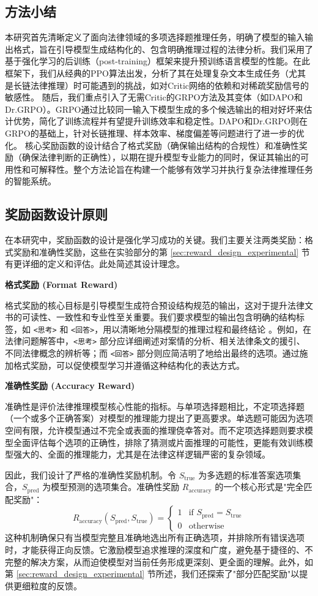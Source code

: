 \documentclass{article}
\begin{document}
\subsection{方法小结}
本研究首先清晰定义了面向法律领域的多项选择题推理任务，明确了模型的输入输出格式，旨在引导模型生成结构化的、包含明确推理过程的法律分析。我们采用了基于强化学习的后训练（post-training）框架来提升预训练语言模型的性能。在此框架下，我们从经典的PPO算法出发，分析了其在处理复杂文本生成任务（尤其是长链法律推理）时可能遇到的挑战，如对Critic网络的依赖和对稀疏奖励信号的敏感性。
随后，我们重点引入了无需Critic的GRPO方法及其变体（如DAPO和Dr.GRPO）。GRPO通过比较同一输入下模型生成的多个候选输出的相对好坏来估计优势，简化了训练流程并有望提升训练效率和稳定性。DAPO和Dr.GRPO则在GRPO的基础上，针对长链推理、样本效率、梯度偏差等问题进行了进一步的优化。
核心奖励函数的设计结合了格式奖励（确保输出结构的合规性）和准确性奖励（确保法律判断的正确性），以期在提升模型专业能力的同时，保证其输出的可用性和可解释性。整个方法论旨在构建一个能够有效学习并执行复杂法律推理任务的智能系统。

\subsection{奖励函数设计原则}
在本研究中，奖励函数的设计是强化学习成功的关键。我们主要关注两类奖励：格式奖励和准确性奖励，这些在实验部分的第 \ref{sec:reward_design_experimental} 节有更详细的定义和评估。此处简述其设计理念。

\textbf{格式奖励 (Format Reward)}

格式奖励的核心目标是引导模型生成符合预设结构规范的输出，这对于提升法律文书的可读性、一致性和专业性至关重要。我们要求模型的输出包含明确的结构标签，如 \texttt{<思考>} 和 \texttt{<回答>}，用以清晰地分隔模型的推理过程和最终结论 \cite{guo2025deepseek}。例如，在法律问题解答中，\texttt{<思考>} 部分应详细阐述对案情的分析、相关法律条文的援引、不同法律概念的辨析等；而 \texttt{<回答>} 部分则应简洁明了地给出最终的选项。通过施加格式奖励，可以促使模型学习并遵循这种结构化的表达方式。

\textbf{准确性奖励 (Accuracy Reward)}

准确性是评价法律推理模型核心性能的指标。与单项选择题相比，不定项选择题（一个或多个正确答案）对模型的推理能力提出了更高要求。单选题可能因为选项空间有限，允许模型通过不完全或表面的推理侥幸答对。而不定项选择题则要求模型全面评估每个选项的正确性，排除了猜测或片面推理的可能性，更能有效训练模型强大的、全面的推理能力，尤其是在法律这样逻辑严密的复杂领域。

因此，我们设计了严格的准确性奖励机制。令 $S_{\text{true}}$ 为多选题的标准答案选项集合，$S_{\text{pred}}$ 为模型预测的选项集合。准确性奖励 $R_{\text{accuracy}}$ 的一个核心形式是"完全匹配奖励"：
$$ R_{\text{accuracy}}(S_{\text{pred}}, S_{\text{true}}) = \begin{cases} 1 & \text{if } S_{\text{pred}} = S_{\text{true}} \\ 0 & \text{otherwise} \end{cases} $$
这种机制确保只有当模型完整且准确地选出所有正确选项，并排除所有错误选项时，才能获得正向反馈。它激励模型追求推理的深度和广度，避免基于捷径的、不完整的解决方案，从而迫使模型对当前任务形成更深刻、更全面的理解。此外，如第 \ref{sec:reward_design_experimental} 节所述，我们还探索了"部分匹配奖励"以提供更细粒度的反馈。
\end{document}
